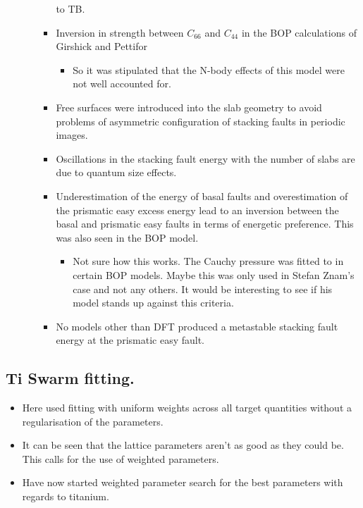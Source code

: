 \documentclass[11pt]{article}
\begin{document}
\begin{enumerate}
\begin{enumerate}
\begin{itemize}
to TB.
\item Inversion in strength between $C_{66}$ and $C_{44}$ in the BOP
calculations of Girshick and Pettifor
\begin{itemize}
\item So it was stipulated that the N-body effects of this model were not
well accounted for.
\end{itemize}
\item Free surfaces were introduced into the slab geometry to avoid problems
of asymmetric configuration of stacking faults in periodic images.
\item Oscillations in the stacking fault energy with the number of slabs are
due to quantum size effects.
\item Underestimation of the energy of basal faults and overestimation of the
prismatic easy excess energy lead to an inversion between the basal and
prismatic easy faults in terms of energetic preference. This was also
seen in the BOP model.  
\begin{itemize}
\item Not sure how this works. The Cauchy pressure was fitted to in certain
BOP models. Maybe this was only used in Stefan Znam's case and not
any others. It would be interesting to see if his model stands up
against this criteria.
\end{itemize}
\item No models other than DFT produced a metastable stacking fault energy at
the prismatic easy fault.
\end{itemize}
\end{enumerate}
\end{enumerate}



\subsection{Ti Swarm fitting.}
\label{sec-2-3}
\begin{itemize}
\item Here used fitting with uniform weights across all target quantities
without a regularisation of the parameters.
\item It can be seen that the lattice parameters aren't as good as they could
be. This calls for the use of weighted parameters.
\item Have now started weighted parameter search for the best parameters with
regards to titanium.
\end{itemize}
\end{document}
